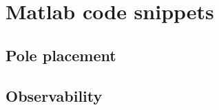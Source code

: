     \section{Matlab code snippets}\label{sec:matlab_snippets}
\subsection{Pole placement} \label{sec:matlab_pole_placement}


\bigskip

\subsection{Observability} \label{sec:matlab_observability}

